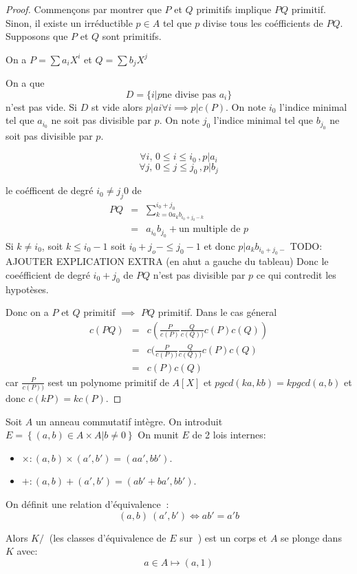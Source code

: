 \begin{proof}
	Commençons par montrer que $P$ et $Q$ primitifs implique $PQ$ primitif. \\
	Sinon, il existe un irréductible $p \in A $ tel que $p$ divise tous les coéfficients de $PQ$.
	Supposons que $P$ et $Q$ sont primitifs.

	On a $P = \sum a_iX^i$ et  $Q = \sum b_jX^j$

	On a que $$D = \{i | p \text{ne divise pas } a_i \}$$ n'est pas vide. Si $D$ st vide alors $p | ai \forall i \implies p | c(P)$.
	On note $i_0$ l'indice minimal tel que $a_{i_0}$ ne soit pas divisible par $p$.
	On note $j_0$ l'indice minimal tel que $b_{j_0}$ ne soit pas divisible par $p$.

	$$\forall i, \, 0 \leq i \leq i_0\,, p | a_i$$
	$$\forall j, \, 0 \leq j \leq j_0\,, p | b_j$$


	le coéfficent de degré $i_0 \neq j_j0$ de
	\begin{eqnarray*}
		PQ &=& \sum\limits^{i_0 + j_0}_{k=0 a_k b_{i_0 + j_0 - k}} \\
		&=& a_{i_0}b_{j_0} + \text{un multiple de } p
	\end{eqnarray*}
	Si $k \neq i_0$, soit  $k\leq i_0 -1$ soit $i_0+j_o - \leq j_0 -1$ et donc $ p | a_kb_{i_0 + j_0 - }$
	TODO: AJOUTER EXPLICATION EXTRA (en ahut a gauche du tableau)
	Donc le coeéfficient de degré $i_0+j_0$ de $PQ$ n'est pas divisible par $p$ ce qui contredit les hypotèses.

	Donc on a $P$ et $Q$ primitif $\implies$ $PQ$ primitif.
	Dans le cas géneral
	\begin{eqnarray*}
		c(PQ) &=& c(\frac{P}{c(P)}\frac{Q}{c(Q))}c(P)c(Q))\\
		&=& c(\frac{P}{c(P))}\frac{Q}{c(Q))}c(P)c(Q)\\
		&=& c(P)c(Q)
	\end{eqnarray*}
	car $\frac{P}{c(P))}$ sest un polynome primitif de $A[X]$ et
	$pgcd(ka, kb) = k pgcd(a,b)$ et donc $c(kP) = kc(P)$.
\end{proof}


\begin{definition}
	Soit $A$ un anneau  commutatif intègre.
	On introduit $E = \left\{ (a,b) \in A\times A | b \neq 0 \right\}$ %
	On munit  $E$ de 2 lois internes:
	\begin{itemize}
		\item $\times : (a,b) \times (a', b') = (aa',bb')$.
		\item $+ : (a,b) + (a', b') = (ab' + ba',bb')$.
	\end{itemize}

	On définit une relation d'équivalence $~$:
	$$ (a,b) ~ (a',b') \iff ab' = a'b $$

	Alors $K/~$ (les classes d'équivalence de $E$ sur $~$) est un corps et $A$ se plonge dans $K$ avec:
	$$ a \in A  \mapsto (a,1 )$$ %
\end{definition}



